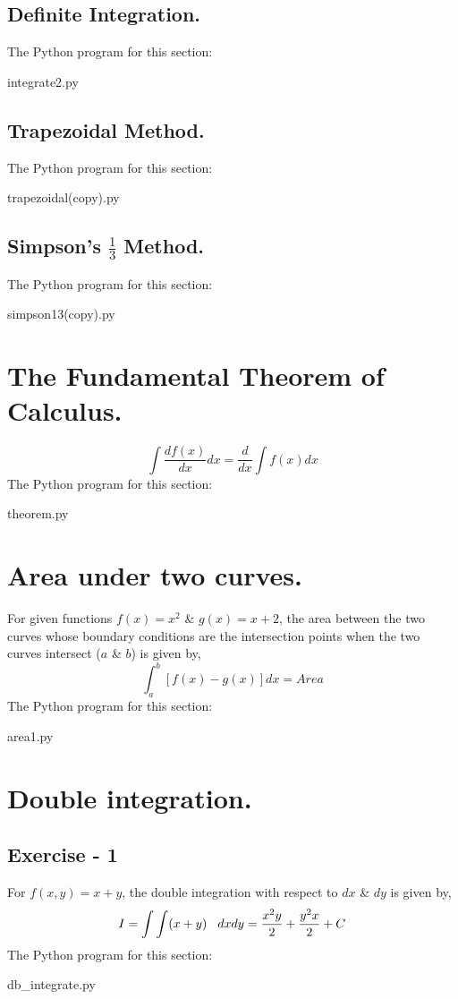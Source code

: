 \documentclass{article}
\begin{document}
\subsection{Definite Integration.}
The Python program for this section:

{integrate2.py}

\newpage
\subsection{Trapezoidal Method.}
The Python program for this section:

{trapezoidal(copy).py}

\newpage
\subsection{Simpson's $\frac{1}{3}$ Method.}
The Python program for this section:

{simpson13(copy).py}

\newpage
\section{The Fundamental Theorem of Calculus.}
\begin{equation}
\int \frac{d f(x)}{dx} dx = \frac{d}{dx}\int f(x)dx
\end{equation}
The Python program for this section:

{theorem.py}

\newpage
\section{Area under two curves.}
For given functions $f(x)=x^{2}$ \& $g(x)=x+2$, the area between the two curves whose boundary conditions are the intersection points when the two curves intersect ($a$ \& $b$) is given by,  
\begin{equation}
\int_{a}^{b}[f(x)-g(x)] dx = Area
\end{equation}
The Python program for this section:

{area1.py}

\newpage
\section{Double integration.}
\subsection{Exercise - 1}
For $f(x,y) = x + y$, the double integration with respect to $dx$ \& $dy$ is given by,
\begin{equation}
I = \int \int (x+y)\hspace{0.3cm} dxdy = \frac{x^{2}y}{2}+\frac{y^{2}x}{2}+C
\end{equation}
The Python program for this section:

{db_integrate.py}
\newpage
\end{document}
